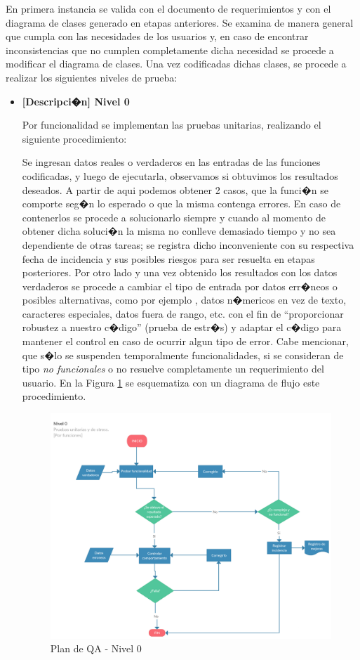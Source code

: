 En primera instancia se valida con el documento de requerimientos y con el diagrama de clases generado en etapas anteriores. Se examina de manera general que cumpla con las necesidades de los usuarios y, en caso de encontrar inconsistencias que no cumplen completamente dicha necesidad se procede a modificar el diagrama de clases. Una vez codificadas dichas clases, se procede a realizar los siguientes niveles de prueba:\newline



\begin{itemize}
	\item \textbf{ [Descripci�n] Nivel 0 } 
	
	\par Por funcionalidad se implementan las pruebas unitarias, realizando el siguiente procedimiento: 
	\par Se ingresan datos reales o verdaderos en las entradas de las funciones codificadas, y luego de ejecutarla, observamos si obtuvimos los resultados deseados. A partir de aqui podemos obtener 2 casos, que la funci�n se comporte seg�n lo esperado o que la misma contenga errores. En caso de contenerlos se procede a solucionarlo siempre y cuando  al momento de obtener dicha soluci�n la misma no conlleve demasiado tiempo y no sea dependiente de otras tareas; se registra dicho inconveniente con su respectiva fecha de incidencia y sus posibles riesgos para ser resuelta en etapas posteriores.
	Por otro lado y una vez obtenido los resultados con los datos verdaderos se procede a cambiar el tipo de entrada por datos err�neos o posibles alternativas, como por ejemplo , datos n�mericos en vez de texto, caracteres especiales, datos fuera de rango, etc. con el fin de ``proporcionar robustez a nuestro c�digo'' (prueba de estr�s) y adaptar el c�digo para  mantener el control en caso de ocurrir algun tipo de error. Cabe mencionar, que s�lo se suspenden temporalmente funcionalidades, si se consideran de tipo \textit{no funcionales} o no resuelve completamente un requerimiento del usuario. En la Figura \ref{fig:nivel-0} se esquematiza con un diagrama de flujo este procedimiento. 
	
	\begin{figure}[h!]
		\centering
		\includegraphics[width=0.7\linewidth, height=0.4\textheight]{Imagenes/Nivel0}
		\caption{Plan de QA - Nivel 0}
		\label{fig:nivel-0}
	\end{figure}
	

\end{itemize}
